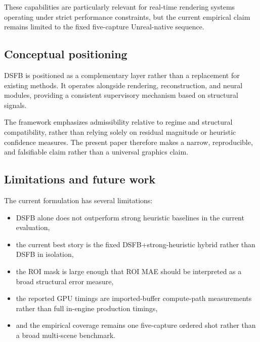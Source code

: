 \documentclass[11pt]{article}
\theoremstyle{definition}
\theoremstyle{plain}
\begin{document}
These capabilities are particularly relevant for real-time rendering systems operating under strict performance constraints, but the current empirical claim remains limited to the fixed five-capture Unreal-native sequence.


\subsection{Conceptual positioning}

DSFB is positioned as a complementary layer rather than a replacement for existing methods. It operates alongside rendering, reconstruction, and neural modules, providing a consistent supervisory mechanism based on structural signals.

The framework emphasizes admissibility relative to regime and structural compatibility, rather than relying solely on residual magnitude or heuristic confidence measures. The present paper therefore makes a narrow, reproducible, and falsifiable claim rather than a universal graphics claim.


\subsection{Limitations and future work}

The current formulation has several limitations:

\begin{itemize}[leftmargin=1.5em]
    \item DSFB alone does not outperform strong heuristic baselines in the current evaluation,
    \item the current best story is the fixed DSFB+strong-heuristic hybrid rather than DSFB in isolation,
    \item the ROI mask is large enough that ROI MAE should be interpreted as a broad structural error measure,
    \item the reported GPU timings are imported-buffer compute-path measurements rather than full in-engine production timings,
    \item and the empirical coverage remains one five-capture ordered shot rather than a broad multi-scene benchmark.
\end{itemize}
\end{document}
